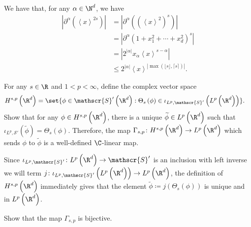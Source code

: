 \documentclass[10pt]{mypackage}
\renewcommand{\coloneq}{\coloneqq}
\begin{document}
\begin{solution}
  We have that, for any $\alpha\in \N^{d}$, we have
  \begin{align*}
    \left\vert \partial^{\alpha}\left( \left\langle x \right\rangle^{2s} \right) \right\vert &= \left\vert \partial^{\alpha}\left( \left( \left\langle x \right\rangle^2 \right)^{s} \right) \right\vert\\
                                             &= \left\vert \partial^{\alpha}\left(  1 + x_1^2 + \cdots + x_d^2 \right)^{s} \right\vert\\
                                             &= \left\vert 2^{\left\vert \alpha \right\vert}x_{\alpha} \left\langle x \right\rangle^{s-\alpha} \right\vert\\
                                             &\leq 2^{\left\vert \alpha \right\vert}\left\langle x \right\rangle^{\left\vert \max\left( \lfloor s \rfloor,\lceil s \rceil \right) \right\vert}.
  \end{align*}
\end{solution}
\begin{problem}
  For any $s\in \R$ and $1 < p < \infty$, define the complex vector space
  \begin{align*}
    H^{s,p}\left( \R^d \right) &= \set{\phi\in \mathscr{S}'\left( \R^d \right) : \Theta_s\left( \phi \right)\in \iota_{L^p,\mathscr{S}'}\left( L^p\left( \R^d \right) \right)}.
  \end{align*}
  Show that for any $\phi\in H^{s,p}\left( \R^d \right)$, there is a unique $ \widetilde{\phi}\in L^p\left( \R^d \right) $ such that $ \iota_{L^p, \mathscr{S}'}\left( \widetilde{\phi} \right) = \Theta_s\left( \phi \right)$. Therefore, the map $\Gamma_{s,p}\colon H^{s,p}\left( \R^d \right)\to L^p\left( \R^d \right)$ which sends $\phi$ to $ \widetilde{\phi} $ is a well-defined $\C$-linear map.
\end{problem}
\begin{solution}
  Since $\iota_{L^p,\mathscr{S}'}\colon L^p\left( \R^d \right)\to \mathscr{S}'$ is an inclusion with left inverse we will term $j\colon \iota_{L^p,\mathscr{S}'}\left( L^p\left( \R^d \right) \right)\to L^p\left( \R^d \right)$, the definition of $H^{s,p}\left( \R^d \right)$ immediately gives that the element $ \widetilde{\phi} \coloneq j\left( \Theta_s\left( \phi \right) \right)$ is unique and in $L^p\left( \R^d \right)$.
\end{solution}
\begin{problem}
  Show that the map $\Gamma_{s,p}$ is bijective.
\end{problem}
\end{document}
